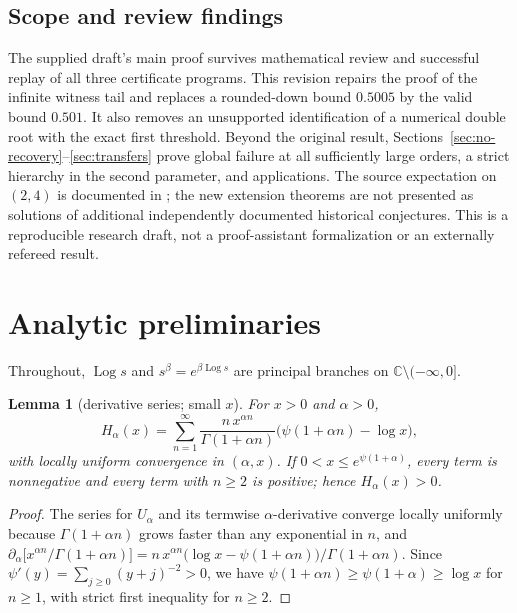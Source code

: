 \documentclass[11pt,a4paper]{article}
\theoremstyle{plain}
\newtheorem{lemma}[theorem]{Lemma}
\theoremstyle{remark}
\newcommand{\C}{\mathbb C}
\DeclareMathOperator{\Log}{Log}
\begin{document}
\subsection{Scope and review findings}
The supplied draft's main proof survives mathematical review and successful
replay of all three certificate programs. This revision repairs the proof of
the infinite witness tail and replaces a rounded-down bound $0.5005$ by the
valid bound $0.501$. It also removes an unsupported identification of a
numerical double root with the exact first threshold. Beyond the original
result, Sections~\ref{sec:no-recovery}--\ref{sec:transfers} prove global
failure at all sufficiently large orders, a strict hierarchy in the second
parameter, and applications. The source expectation on $(2,4)$ is documented
in \cite[Remark 1(a)]{FS}; the new extension theorems are not presented as
solutions of additional independently documented historical conjectures.
This is a reproducible research draft, not a proof-assistant formalization or
an externally refereed result.

\section{Analytic preliminaries}\label{sec:prelim}
Throughout, $\Log s$ and $s^\beta=e^{\beta\Log s}$ are principal branches on
$\C\setminus(-\infty,0]$.

\begin{lemma}[derivative series; small $x$]\label{lem:small}
For $x>0$ and $\alpha>0$,
\begin{equation}\label{eq:series}
 H_\alpha(x)=\sum_{n=1}^{\infty}\frac{n\,x^{\alpha n}}{\Gamma(1+\alpha n)}
 \bigl(\psi(1+\alpha n)-\log x\bigr),
\end{equation}
with locally uniform convergence in $(\alpha,x)$. If $0<x\le e^{\psi(1+\alpha)}$, every term is
nonnegative and every term with $n\ge2$ is positive; hence $H_\alpha(x)>0$.
\end{lemma}
\begin{proof}
The series for $U_\alpha$ and its termwise $\alpha$-derivative converge locally uniformly because
$\Gamma(1+\alpha n)$ grows faster than any exponential in $n$, and
$\partial_\alpha\bigl[x^{\alpha n}/\Gamma(1+\alpha n)\bigr]
 =n\,x^{\alpha n}\bigl(\log x-\psi(1+\alpha n)\bigr)/\Gamma(1+\alpha n)$.
Since $\psi'(y)=\sum_{j\ge0}(y+j)^{-2}>0$, we have
$\psi(1+\alpha n)\ge\psi(1+\alpha)\ge\log x$ for $n\ge1$, with strict first inequality for $n\ge2$.
\end{proof}
\end{document}
